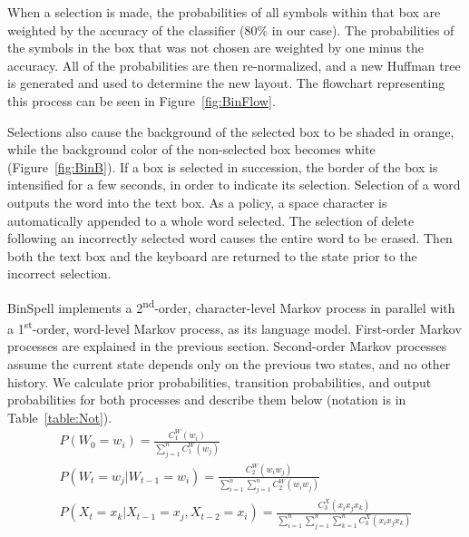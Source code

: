 \documentclass[12pt,titlepage]{article}
\begin{document}
When a selection is made, the probabilities of all symbols within that box are weighted by the accuracy 
of the classifier (80\% in our case).  The probabilities of the symbols in the box that was not chosen are 
weighted by one minus the accuracy.  All of the probabilities are then re-normalized, and a new 
Huffman tree is generated and used to determine the new layout.  The flowchart representing this 
process can be seen in Figure~\ref{fig:BinFlow}.

Selections also cause the background of the selected box to be shaded in orange, while the background 
color of the non-selected box becomes white (Figure~\ref{fig:BinB}).  If a box is selected in succession, the border of the 
box is intensified for a few seconds, in order to indicate its selection.  Selection of a word outputs the 
word into the text box.  As a policy, a space character is automatically appended to a whole word 
selected.  The selection of delete following an incorrectly selected word causes the entire word to be 
erased.  Then both the text box and the keyboard are returned to the state prior to the incorrect 
selection.

BinSpell implements a 2\textsuperscript{nd}-order, character-level Markov process in parallel with a 1\textsuperscript{st}-order, word-level 
Markov process, as its language model.  First-order Markov processes are explained in the previous 
section.  Second-order Markov processes assume the current state depends only on the previous two 
states, and no other history.  We calculate prior probabilities, transition probabilities, and output 
probabilities for both processes and describe them below (notation is in Table~\ref{table:Not}).
\begin{gather*}
P(W_0 = w_i) = \frac{C_1^W(w_i)}{\displaystyle \sum_{j=1}^n C_1^W(w_j)} \tag{4} \\
P(W_t = w_j | W_{t-1} = w_i) = \frac{C_2^W(w_i w_j)}{\displaystyle \sum_{i=1}^n \sum_{j=1}^n C_2^W(w_i w_j)} \tag{5} \\
P(X_t = x_k | X_{t-1} = x_j, X_{t-2} = x_i) = \frac{C_3^X(x_i x_j x_k)}{\displaystyle \sum_{i=1}^n \sum_{j=1}^n \sum_{k=1}^n C_3^X(x_i x_j x_k)} \tag{6}
\end{gather*}
\end{document}
